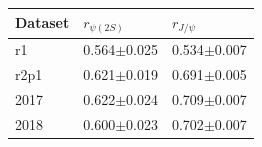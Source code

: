 \begin{tabular}{lll}
\toprule
Dataset & $r_{\psi(2S)}$ & $r_{J/\psi}$ \\
\midrule
r1 & 0.564$\pm$0.025 & 0.534$\pm$0.007 \\
r2p1 & 0.621$\pm$0.019 & 0.691$\pm$0.005 \\
2017 & 0.622$\pm$0.024 & 0.709$\pm$0.007 \\
2018 & 0.600$\pm$0.023 & 0.702$\pm$0.007 \\
\bottomrule
\end{tabular}

